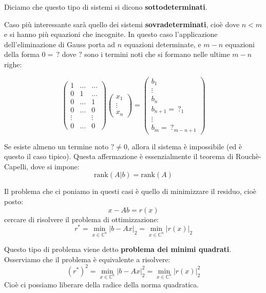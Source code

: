 \documentclass[a4paper,11pt]{article}
\begin{document}
Diciamo che questo tipo di sistemi si dicono \textbf{sottodeterminati}.

Caso più interessante sarà quello dei sistemi \textbf{sovradeterminati}, cioè dove $n < m$ e si hanno più equazioni che incognite.
In questo caso l'applicazione dell'eliminazione di Gauss porta ad $n$ equazioni determinate, e $m  - n$ equazioni della forma $0 = \, ?$ dove $?$ sono i termini noti che si formano nelle ultime $m - n$ righe:

$$
\begin{pmatrix}
	1 & ... & ... \\ 
	0 & 1 & ... \\ 
	0 & ... & 1 \\ 
	0 & ... & 0 \\ 
	\vdots & & \vdots \\ 
	0 & ... & 0
\end{pmatrix}
\begin{pmatrix}
	x_1 \\ \vdots \\ x_n
\end{pmatrix} =
\begin{pmatrix}
	b_1 \\ \vdots \\ b_n \\ b_{n + 1} = \ ?_1 \\ \vdots \\ b_m = \ ?_{m - n + 1}
\end{pmatrix}
$$

Se esiste almeno un termine noto $? \neq 0$, allora il sistema è impossibile (ed è questo il caso tipico).
Questa affermazione è essenzialmente il teorema di Rouchè-Capelli, dove si impone:
$$
\mathrm{rank}(A | b) = \mathrm{rank}(A)
$$

Il problema che ci poniamo in questi casi è quello di minimizzare il residuo, cioè posto:
$$
x - Ab = r(x)
$$
cercare di risolvere il problema di ottimizzazione:
$$
r^* = \min_{x \in \mathbb{C}^n} |b - Ax|_2 = \min_{x \in \mathbb{C}^n} |r(x)|_2
$$

Questo tipo di problema viene detto \textbf{problema dei minimi quadrati}.
Osserviamo che il problema è equivalente a risolvere:
$$
\left(r^*\right)^2 = \min_{x \in \mathbb{C}^n} |b - Ax|_2^2 = \min_{x \in \mathbb{C}^n} |r(x)|_2^2
$$
Cioè ci possiamo liberare della radice della norma quadratica.
\end{document}
